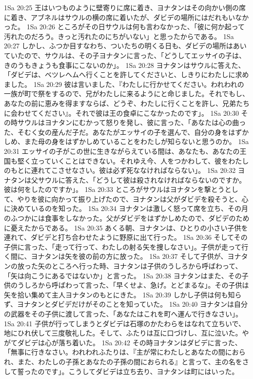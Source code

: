 1Sa 20:25  王はいつものように壁寄りに席に着き、ヨナタンはその向かい側の席に着き、アブネルはサウルの横の席に着いたが、ダビデの場所にはだれもいなかった。
1Sa 20:26  ところがその日サウルは何も言わなかった、「彼に何か起って汚れたのだろう。きっと汚れたのにちがいない」と思ったからである。
1Sa 20:27  しかし、ふつか目すなわち、ついたちの明くる日も、ダビデの場所はあいていたので、サウルは、その子ヨナタンに言った、「どうしてエッサイの子は、きのうもきょうも食事にこないのか」。
1Sa 20:28  ヨナタンはサウルに答えた、「ダビデは、ベツレヘムへ行くことを許してくださいと、しきりにわたしに求めました。
1Sa 20:29  彼は言いました、『わたしに行かせてください。われわれの一族が町で祭をするので、兄がわたしに来るようにと命じました。それでもし、あなたの前に恵みを得ますならば、どうぞ、わたしに行くことを許し、兄弟たちに会わせてください』。それで彼は王の食卓にこなかったのです」。
1Sa 20:30  その時サウルはヨナタンにむかって怒りを発し、彼に言った、「あなたは心の曲った、そむく女の産んだ子だ。あなたがエッサイの子を選んで、自分の身をはずかしめ、また母の身をはずかしめていることをわたしが知らないと思うのか。
1Sa 20:31  エッサイの子がこの世に生きながらえている間は、あなたも、あなたの王国も堅く立っていくことはできない。それゆえ今、人をつかわして、彼をわたしのもとに連れてこさせなさい。彼は必ず死ななければならない」。
1Sa 20:32  ヨナタンは父サウルに答えた、「どうして彼は殺されなければならないのですか。彼は何をしたのですか」。
1Sa 20:33  ところがサウルはヨナタンを撃とうとして、やりを彼に向かって振り上げたので、ヨナタンは父がダビデを殺そうと、心に決めているのを知った。
1Sa 20:34  ヨナタンは激しく怒って席を立ち、その月のふつかには食事をしなかった。父がダビデをはずかしめたので、ダビデのために憂えたからである。
1Sa 20:35  あくる朝、ヨナタンは、ひとりの小さい子供を連れて、ダビデと打ち合わせたように野原に出て行った。
1Sa 20:36  そしてその子供に言った、「走って行って、わたしの射る矢を捜しなさい」。子供が走って行く間に、ヨナタンは矢を彼の前の方に放った。
1Sa 20:37  そして子供が、ヨナタンの放った矢のところへ行った時、ヨナタンは子供のうしろから呼ばわって、「矢は向こうにあるではないか」と言った。
1Sa 20:38  ヨナタンはまた、その子供のうしろから呼ばわって言った、「早くせよ、急げ。とどまるな」。その子供は矢を拾い集めて主人ヨナタンのもとにきた。
1Sa 20:39  しかし子供は何も知らず、ヨナタンとダビデだけがそのことを知っていた。
1Sa 20:40  ヨナタンは自分の武器をその子供に渡して言った、「あなたはこれを町へ運んで行きなさい」。
1Sa 20:41  子供が行ってしまうとダビデは石塚のかたわらをはなれて立ちいで、地にひれ伏して三度敬礼した。そして、ふたりは互に口づけし、互に泣いた。やがてダビデは心が落ち着いた。
1Sa 20:42  その時ヨナタンはダビデに言った、「無事に行きなさい。われわれふたりは、『主が常にわたしとあなたの間におられ、また、わたしの子孫とあなたの子孫の間におられる』と言って、主の名をさして誓ったのです」。こうしてダビデは立ち去り、ヨナタンは町にはいった。
